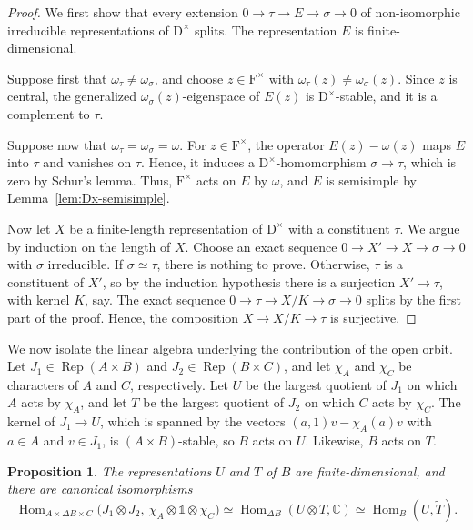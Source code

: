 \documentclass[11pt]{amsart}
\numberwithin{equation}{section}
\theoremstyle{plain}
\newtheorem{proposition}[theorem]{Proposition}
\theoremstyle{definition}
\theoremstyle{remark}
\newcommand{\C}{\mathbb{C}}
\newcommand{\one}{\mathds{1}}
\DeclareMathOperator{\Hom}{Hom}
\DeclareMathOperator{\Rep}{Rep}
\begin{document}
\begin{proof}
	We first show that every extension $0\to\tau\to E\to\sigma\to0$ of non-isomorphic irreducible representations of $\mathrm{D}^\times$ splits. The representation $E$ is finite-dimensional.
	
	Suppose first that $\omega_\tau\ne\omega_\sigma$, and choose $z\in \mathrm{F}^\times$ with $\omega_\tau(z)\ne\omega_\sigma(z)$. Since $z$ is central, the generalized $\omega_\sigma(z)$-eigenspace of $E(z)$ is $\mathrm{D}^\times$-stable, and it is a complement to $\tau$.
	
	Suppose now that $\omega_\tau=\omega_\sigma=\omega$. For $z\in \mathrm{F}^\times$, the operator $E(z)-\omega(z)$ maps $E$ into $\tau$ and vanishes on $\tau$. Hence, it induces a $\mathrm{D}^\times$-homomorphism $\sigma\to\tau$, which is zero by Schur's lemma. Thus, $\mathrm{F}^\times$ acts on $E$ by $\omega$, and $E$ is semisimple by Lemma~\ref{lem:Dx-semisimple}.
	
	Now let $X$ be a finite-length representation of $\mathrm{D}^\times$ with a constituent $\tau$. We argue by induction on the length of $X$. Choose an exact sequence $0\to X'\to X\to\sigma\to0$ with $\sigma$ irreducible. If $\sigma\simeq\tau$, there is nothing to prove. Otherwise, $\tau$ is a constituent of $X'$, so by the induction hypothesis there is a surjection $X'\to\tau$, with kernel $K$, say. The exact sequence $0\to\tau\to X/K\to\sigma\to0$ splits by the first part of the proof. Hence, the composition $X\to X/K\to\tau$ is surjective.
\end{proof}

We now isolate the linear algebra underlying the contribution of the open orbit. Let $J_1\in\Rep(A\times B)$ and $J_2\in\Rep(B\times C)$, and let $\chi_A$ and $\chi_C$ be characters of $A$ and $C$, respectively. Let $U$ be the largest quotient of $J_1$ on which $A$ acts by $\chi_A$, and let $T$ be the largest quotient of $J_2$ on which $C$ acts by $\chi_C$. The kernel of $J_1\to U$, which is spanned by the vectors $(a,1)v-\chi_A(a)v$ with $a\in A$ and $v\in J_1$, is $(A\times B)$-stable, so $B$ acts on $U$. Likewise, $B$ acts on $T$.

\begin{proposition}\label{prop:U-T}
	The representations $U$ and $T$ of $B$ are finite-dimensional, and there are canonical isomorphisms
	$$
	\Hom_{A\times\Delta B\times C}\big(J_1\otimes J_2,\ \chi_A\otimes\one\otimes\chi_C\big)\simeq\Hom_{\Delta B}(U\otimes T,\C)\simeq\Hom_B(U,\widetilde T).
	$$
\end{proposition}
\end{document}
